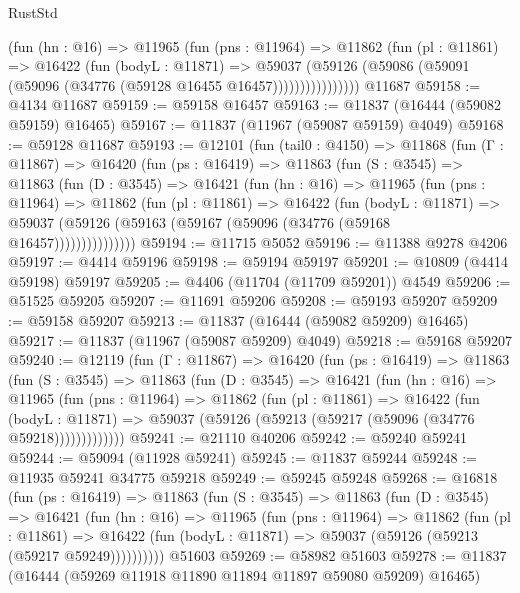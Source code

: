 \begin{lexlean}{RustStd}
\begin{coremodule}
{\begin{coremodule}
{{{{{{{{{{{{{{{{{{{{{{{{{{{{{{{{{{{{{{{{{{{{{{{{{{                (fun (hn : @16) =>
                @11965
                  (fun (pns : @11964) =>
                  @11862
                    (fun (pl : @11861) =>
                    @16422
                      (fun (bodyL : @11871) =>
                      @59037
                        (@59126
                          (@59086 (@59091 (@59096 (@34776 (@59128 @16455 @16457))))))))))))))))
    @11687
@59158 := @4134 @11687
@59159 := @59158 @16457
@59163 := @11837 (@16444 (@59082 @59159) @16465)
@59167 := @11837 (@11967 (@59087 @59159) @4049)
@59168 := @59128 @11687
@59193 := @12101
    (fun (tail0 : @4150) =>
    @11868
      (fun (Γ : @11867) =>
      @16420
        (fun (ps : @16419) =>
        @11863
          (fun (S : @3545) =>
          @11863
            (fun (D : @3545) =>
            @16421
              (fun (hn : @16) =>
              @11965
                (fun (pns : @11964) =>
                @11862
                  (fun (pl : @11861) =>
                  @16422
                    (fun (bodyL : @11871) =>
                    @59037 (@59126 (@59163 (@59167 (@59096 (@34776 (@59168 @16457)))))))))))))))
@59194 := @11715 @5052
@59196 := @11388 @9278 @4206
@59197 := @4414 @59196
@59198 := @59194 @59197
@59201 := @10809 (@4414 @59198) @59197
@59205 := @4406 (@11704 (@11709 @59201)) @4549
@59206 := @51525 @59205
@59207 := @11691 @59206
@59208 := @59193 @59207
@59209 := @59158 @59207
@59213 := @11837 (@16444 (@59082 @59209) @16465)
@59217 := @11837 (@11967 (@59087 @59209) @4049)
@59218 := @59168 @59207
@59240 := @12119
    (fun (Γ : @11867) =>
    @16420
      (fun (ps : @16419) =>
      @11863
        (fun (S : @3545) =>
        @11863
          (fun (D : @3545) =>
          @16421
            (fun (hn : @16) =>
            @11965
              (fun (pns : @11964) =>
              @11862
                (fun (pl : @11861) =>
                @16422
                  (fun (bodyL : @11871) =>
                  @59037 (@59126 (@59213 (@59217 (@59096 (@34776 @59218)))))))))))))
@59241 := @21110 @40206
@59242 := @59240 @59241
@59244 := @59094 (@11928 @59241)
@59245 := @11837 @59244
@59248 := @11935 @59241 @34775 @59218
@59249 := @59245 @59248
@59268 := @16818
    (fun (ps : @16419) =>
    @11863
      (fun (S : @3545) =>
      @11863
        (fun (D : @3545) =>
        @16421
          (fun (hn : @16) =>
          @11965
            (fun (pns : @11964) =>
            @11862
              (fun (pl : @11861) =>
              @16422 (fun (bodyL : @11871) => @59037 (@59126 (@59213 (@59217 @59249))))))))))
    @51603
@59269 := @58982 @51603
@59278 := @11837 (@16444 (@59269 @11918 @11890 @11894 @11897 @59080 @59209) @16465)
}}}}}}}}}}}}}}}}}}}}}}}}}}}}}}}}}}}}}}}}}}}}}}}}}}
\end{coremodule}}
\end{coremodule}
\end{lexlean}
